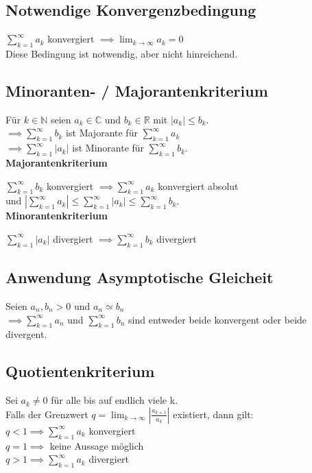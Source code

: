\documentclass[a4paper,9pt]{extarticle}
\newcommand{\liminfty}[1][n]{\lim_{#1 \to \infty}}
\newcommand{\suminfty}[1][k = 1]{\sum_{#1}^{\infty}}
\begin{document}
	\subsection*{Notwendige Konvergenzbedingung}

	$\suminfty{a_k}$ konvergiert $\implies \liminfty[k]{a_k} = 0$ \\
	Diese Bedingung ist notwendig, aber nicht hinreichend.

	\subsection*{Minoranten- / Majorantenkriterium}

	Für $k \in \mathbb{N}$ seien $a_k \in \mathbb{C}$ und $b_k \in \mathbb{R}$ mit $|a_k| \leq b_k$. \\
	$\implies \suminfty{b_k}$ ist Majorante für $\suminfty{a_k}$ \\
	$ \implies \suminfty{|a_k|}$ ist Minorante für $\suminfty{b_k}$. \\

	\textbf{Majorantenkriterium}

	$\suminfty{b_k}$ konvergiert $\implies \suminfty{a_k}$ konvergiert absolut \\ und
	$|\suminfty{a_k}| \leq \suminfty{|a_k|} \leq \suminfty{b_k}$. \\

	\textbf{Minorantenkriterium}
	
	$\suminfty{|a_k|}$ divergiert $\implies \suminfty{b_k}$ divergiert

	\subsection*{Anwendung Asymptotische Gleicheit}

	Seien $a_n, b_n > 0$ und $a_n \simeq b_n$ \\
	$\implies \suminfty{a_n}$ und $\suminfty{b_n}$ sind entweder beide konvergent oder beide divergent.


	\subsection*{Quotientenkriterium}

	Sei $a_k \neq 0$ für alle bis auf endlich viele k. \\
	Falls der Grenzwert $q = \liminfty[k]{|\frac{a_{k+1}}{a_k}|}$ existiert, dann gilt: \\
	$q < 1 \implies \suminfty{a_k}$ konvergiert \\
	$q = 1 \implies $ keine Aussage möglich \\
	$q > 1 \implies \suminfty{a_k}$ divergiert
\end{document}
